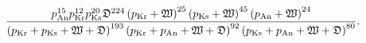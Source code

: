 \documentclass[review]{elsarticle}
\begin{document}
\begin{table}
\caption{Results of 365 chess games \label{kka} between Grandmaster
  Anand, Grandmaster Karpov, and Grandmaster Kasparov.  For example,
  Anand played white against Karpov a total of $18+20+5=43$ times and
  won 18, drew 20, lost 5}
\centering
{}
\end{table}

\begin{equation}\label{kka_likelihood}
\frac{
p_\mathrm{An}^{15}
p_\mathrm{Kr}^{12} 
p_\mathrm{Ks}^{20}
\mathfrak{D}^{224}
\left(p_\mathrm{Kr} + \mathfrak{W}\right)^{25}
\left(p_\mathrm{Ks} + \mathfrak{W}\right)^{45}
\left(p_\mathrm{An} + \mathfrak{W}\right)^{24}
}{
\left(p_\mathrm{Kr} + p_\mathrm{Ks} + \mathfrak{W} + \mathfrak{D}\right)^{193}
\left(p_\mathrm{Kr} + p_\mathrm{An} + \mathfrak{W} + \mathfrak{D}\right)^{92}
\left(p_\mathrm{Ks} + p_\mathrm{An} + \mathfrak{W} + \mathfrak{D}\right)^{80}
}.
\end{equation}
                                    
\end{document}

